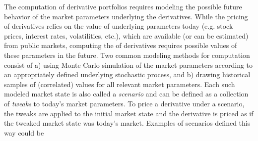The \var{} computation of derivative portfolios requires modeling the possible future behavior of the market parameters underlying the derivatives.
While the pricing of derivatives relies on the value of underlying parameters today (e.g. stock prices, interest rates, volatilities, etc.), which are available (or can be estimated) from public markets, computing the \var{} of derivatives requires possible values of these parameters in the future.
Two common modeling methods for \var{} computation consist of a) using Monte Carlo simulation of the market parameters according to an appropriately defined underlying stochastic process, and b) drawing historical samples of (correlated) values for all relevant market parameters.
Each such modeled market state is also called a \emph{scenario} and can be defined as a collection of \emph{tweaks} to today's market parameters.
To price a derivative under a scenario, the tweaks are applied to the initial market state and the derivative is priced as if the tweaked market state was today's market.
Examples of scenarios defined this way could be
